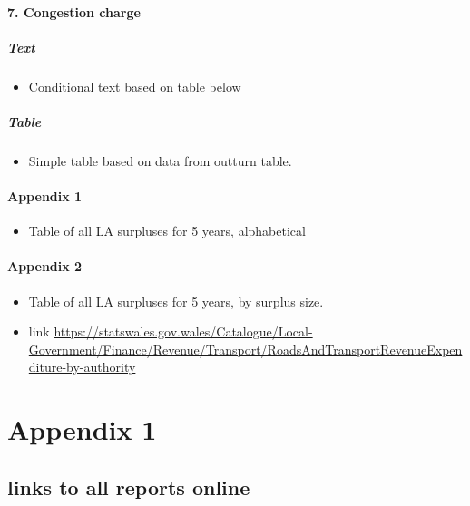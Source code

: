 \documentclass[]{article}
\providecommand{\tightlist}{%
  \setlength{\itemsep}{0pt}\setlength{\parskip}{0pt}}
\let\oldparagraph\paragraph
\renewcommand{\paragraph}[1]{\oldparagraph{#1}\mbox{}}
\let\oldsubparagraph\subparagraph
\renewcommand{\subparagraph}[1]{\oldsubparagraph{#1}\mbox{}}
\begin{document}
\hypertarget{congestion-charge}{%
\paragraph{7. Congestion charge}\label{congestion-charge}}

\hypertarget{text-15}{%
\subparagraph{Text}\label{text-15}}

\begin{itemize}
\tightlist
\item
  Conditional text based on table below
\end{itemize}

\hypertarget{table}{%
\subparagraph{Table}\label{table}}

\begin{itemize}
\tightlist
\item
  Simple table based on data from outturn table.
\end{itemize}

\hypertarget{appendix-1}{%
\paragraph{Appendix 1}\label{appendix-1}}

\begin{itemize}
\tightlist
\item
  Table of all LA surpluses for 5 years, alphabetical
\end{itemize}

\hypertarget{appendix-2}{%
\paragraph{Appendix 2}\label{appendix-2}}

\begin{itemize}
\item
  Table of all LA surpluses for 5 years, by surplus size.
\item
  link
  \href{Wales:}{https://statswales.gov.wales/Catalogue/Local-Government/Finance/Revenue/Transport/RoadsAndTransportRevenueExpenditure-by-authority}
\end{itemize}

\hypertarget{appendix-1-1}{%
\section{Appendix 1}\label{appendix-1-1}}

\hypertarget{links-to-all-reports-online}{%
\subsection{links to all reports
online}\label{links-to-all-reports-online}}
\end{document}
